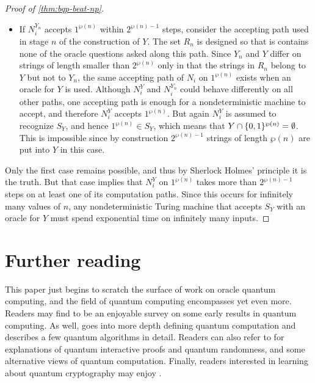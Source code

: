 \documentclass[12pt]{article}
\begin{document}
\begin{mdframed}
\begin{proof}[Proof of \cref{thm:bqp-beat-np}]
\begin{itemize}
      which means that $Y \cap \zo^{\wp(n)} \ne \emptyset$. This is impossible
      since by construction no strings of length $\wp(n)$ are put into $Y$ in
      this case.
    \item If $N_i^{Y_n}$ accepts $1^{\wp(n)}$ within $2^{\wp(n)-1}$ steps,
      consider the accepting path used in stage $n$ of the construction of $Y$.
      The set $R_n$ is designed so that is contains none of the oracle questions
      asked along this path. Since $Y_n$ and $Y$ differ on strings of length
      smaller than $2^{\wp(n)}$ only in that the strings in $R_n$ belong to $Y$
      but not to $Y_n$, the same accepting path of $N_i$ on $1^{\wp(n)}$ exists
      when an oracle for $Y$ is used. Although $N_i^Y$ and $N_i^{Y_n}$ could
      behave differently on all other paths, one accepting path is enough for a
      nondeterministic machine to accept, and therefore $N_i^Y$ accepts
      $1^{\wp(n)}$. But again $N_i^Y$ is assumed to recognize $S_Y$, and hence
      $1^{\wp(n)} \in S_Y$, which means that $Y \cap \{0,1\}^{\wp(n)} = \emptyset$.
      This is impossible since by construction $2^{\wp(n)-1}$ strings of length
      $\wp(n)$ are put into $Y$ in this case.
  \end{itemize}
  Only the first case remains possible, and thus by Sherlock Holmes' principle
  it is the truth. But that case implies that $N_i^Y$ on $1^{\wp(n)}$ takes more
  than $2^{\wp(n)-1}$ steps on at least one of its computation paths. Since this
  occurs for infinitely many values of $n$, any nondeterministic Turing machine
  that accepts $S_Y$ with an oracle for $Y$ must spend exponential time on
  infinitely many inputs.
\end{proof}
\end{mdframed}


\section{Further reading}
This paper just begins to scratch the surface of work on oracle quantum
computing, and the field of quantum computing encompasses yet even more. Readers
may find \cite{BB92b} to be an enjoyable survey on some early results in quantum
computing. As well, \cite{AB09} goes into more depth defining quantum
computation and describes a few quantum algorithms in detail. Readers can also
refer to \cite{Wig19} for explanations of quantum interactive proofs and quantum
randomness, and some alternative views of quantum computation. Finally, readers
interested in learning about quantum cryptography may enjoy \cite{BEM+07}.


\nocite{*}


\end{document}
